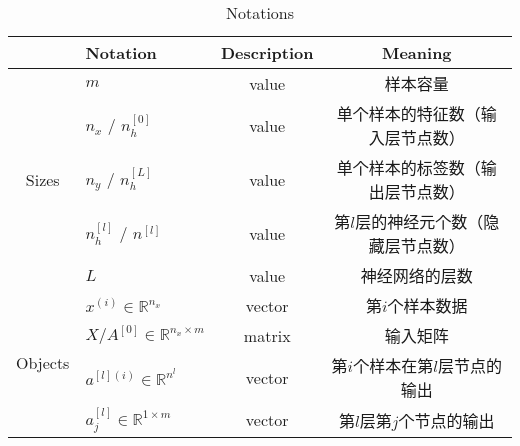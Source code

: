 \begin{table}[htb!]
    \centering
    \begin{threeparttable}
    \caption{Notations}
    \begin{tabular}{clcc}
        \hline
                                    & \textbf{Notation}                                     & \textbf{Description} & \textbf{Meaning}                                                   \\ \hline
        \multirow{5}{*}{Sizes}      & $m$                                                   & value                & 样本容量                                                               \\
                                    & $n_x$ / $n_h^{[0]}$                                   & value                & 单个样本的特征数（输入层节点数）                                         \\
                                    & $n_y$ / $n_h^{[L]}$                                   & value                & 单个样本的标签数（输出层节点数）                                      \\
                                    & $n_h^{[l]}$ / $n^{[l]}$                               & value                & 第$l$层的神经元个数（隐藏层节点数）                                   \\
                                    & $L$                                                   & value                & 神经网络的层数                                                         \\ \hline
        \multirow{11}{*}{Objects}   & $x^{(i)} \in \mathbb{R}^{n_x}$                        & vector               & 第$i$个样本数据                                                          \\
                                    & $X / A^{[0]} \in {\mathbb{R}^{n_x \times m}}$         & matrix               & 输入矩阵                                                               \\
                                    & $a^{[l](i)} \in \mathbb{R}^{n^{l}}$                   & vector               & 第$i$个样本在第$l$层节点的输出                                                  \\
                                    & $a_j^{[l]} \in \mathbb{R}^{1 \times {m}}$             & vector               & 第$l$层第$j$个节点的输出                                                         \\

\end{tabular}
\end{threeparttable}
\end{table}
